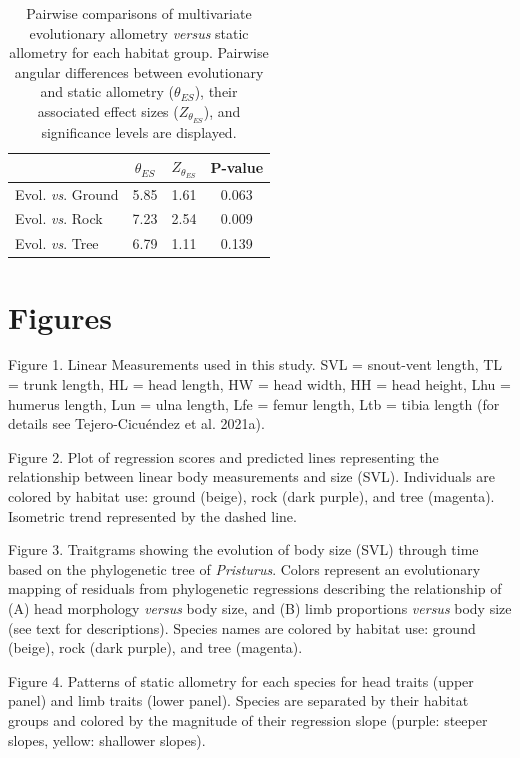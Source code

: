 \documentclass[
  11pt,
]{article}
\begin{document}
\begin{table}[H]

\caption{\label{tab:unnamed-chunk-4}Pairwise comparisons of multivariate evolutionary allometry \textit{versus} static allometry for each habitat group. Pairwise angular differences between evolutionary and static allometry ($\theta_{ES}$), their associated effect sizes ($Z_{\theta_{ES}}$), and significance levels are displayed.}
\centering
\begin{tabular}[t]{lccc}
\toprule
  & $\theta_{ES}$ & $Z_{\theta_{ES}}$ & P-value\\
\midrule
Evol. \textit{vs}. Ground & 5.85 & 1.61 & 0.063\\
Evol. \textit{vs}. Rock & 7.23 & 2.54 & 0.009\\
Evol. \textit{vs}. Tree & 6.79 & 1.11 & 0.139\\
\bottomrule
\end{tabular}
\end{table}

\newpage

\hypertarget{figures}{%
\section{Figures}\label{figures}}

Figure 1. Linear Measurements used in this study. SVL = snout-vent
length, TL = trunk length, HL = head length, HW = head width, HH = head
height, Lhu = humerus length, Lun = ulna length, Lfe = femur length, Ltb
= tibia length (for details see Tejero-Cicuéndez et al. 2021a).

Figure 2. Plot of regression scores and predicted lines representing the
relationship between linear body measurements and size (SVL).
Individuals are colored by habitat use: ground (beige), rock (dark
purple), and tree (magenta). Isometric trend represented by the dashed
line.

Figure 3. Traitgrams showing the evolution of body size (SVL) through
time based on the phylogenetic tree of \emph{Pristurus}. Colors
represent an evolutionary mapping of residuals from phylogenetic
regressions describing the relationship of (A) head morphology
\emph{versus} body size, and (B) limb proportions \emph{versus} body
size (see text for descriptions). Species names are colored by habitat
use: ground (beige), rock (dark purple), and tree (magenta).

Figure 4. Patterns of static allometry for each species for head traits
(upper panel) and limb traits (lower panel). Species are separated by
their habitat groups and colored by the magnitude of their regression
slope (purple: steeper slopes, yellow: shallower slopes).
\end{document}
